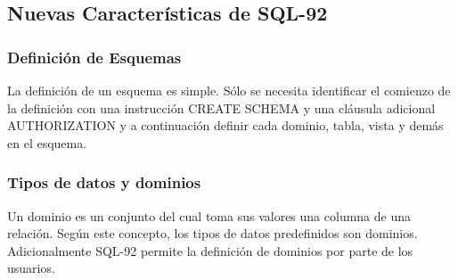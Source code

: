 \documentclass[preprint,12pt]{elsarticle}
\begin{document}
\subsection{\textbf{Nuevas Características de SQL-92}}

\subsubsection{\textbf{Definición de Esquemas}}

La definición de un esquema es simple. Sólo se necesita identificar el comienzo de la definición con una instrucción CREATE SCHEMA y una cláusula adicional AUTHORIZATION y a continuación definir cada dominio, tabla, vista y demás en el esquema. 

\subsubsection{\textbf{Tipos de datos y dominios}}	

Un dominio es un conjunto del cual toma sus valores una columna de una relación. Según este concepto, los tipos de datos predefinidos son dominios. Adicionalmente SQL-92 permite la definición de dominios por parte de los usuarios.
\end{document}
